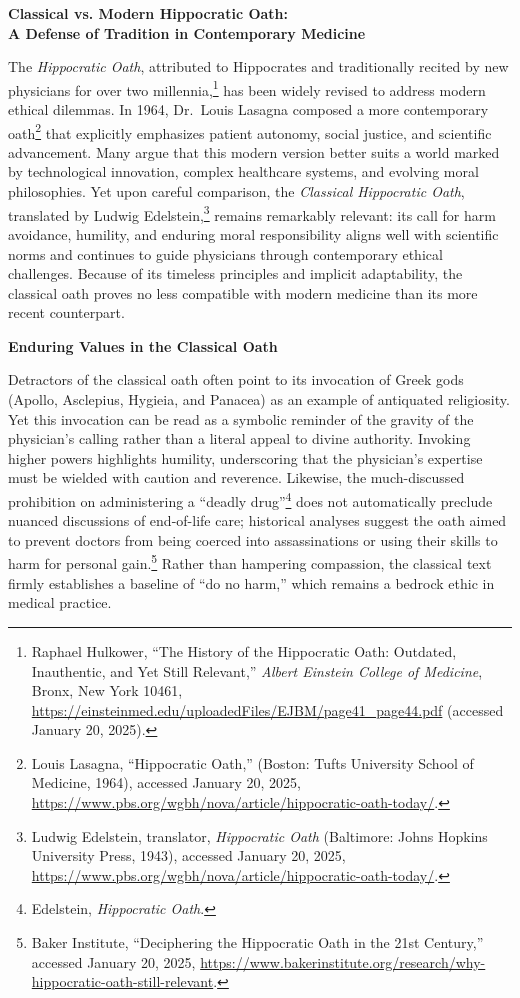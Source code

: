 \documentclass[12pt]{article}
\begin{document}
\begin{center}
\Large \textbf{Classical vs. Modern Hippocratic Oath: \\
A Defense of Tradition in Contemporary Medicine}
\end{center}

\bigskip

The \textit{Hippocratic Oath}, attributed to Hippocrates and traditionally recited by new physicians for over two millennia,\footnote{Raphael Hulkower, 
``The History of the Hippocratic Oath: Outdated, Inauthentic, and Yet Still Relevant,'' 
\textit{Albert Einstein College of Medicine}, Bronx, New York 10461, 
\url{https://einsteinmed.edu/uploadedFiles/EJBM/page41_page44.pdf} (accessed January 20, 2025).} 
has been widely revised to address modern ethical dilemmas. 
In 1964, Dr.\ Louis Lasagna composed a more contemporary oath\footnote{Louis Lasagna, 
``Hippocratic Oath,'' (Boston: Tufts University School of Medicine, 1964), 
accessed January 20, 2025, \url{https://www.pbs.org/wgbh/nova/article/hippocratic-oath-today/}.} 
that explicitly emphasizes patient autonomy, social justice, and scientific advancement. 
Many argue that this modern version better suits a world marked by technological innovation, complex healthcare systems, 
and evolving moral philosophies. 
Yet upon careful comparison, the \textit{Classical Hippocratic Oath}, 
translated by Ludwig Edelstein,\footnote{Ludwig Edelstein, translator, \textit{Hippocratic Oath} 
(Baltimore: Johns Hopkins University Press, 1943), accessed January 20, 2025, 
\url{https://www.pbs.org/wgbh/nova/article/hippocratic-oath-today/}.} 
remains remarkably relevant: its call for harm avoidance, humility, and enduring moral responsibility aligns well with scientific norms 
and continues to guide physicians through contemporary ethical challenges. 
Because of its timeless principles and implicit adaptability, 
the classical oath proves no less compatible with modern medicine than its more recent counterpart.

\bigskip
\textbf{Enduring Values in the Classical Oath}

Detractors of the classical oath often point to its invocation of Greek gods (Apollo, Asclepius, Hygieia, and Panacea) 
as an example of antiquated religiosity. 
Yet this invocation can be read as a symbolic reminder of the gravity of the physician’s calling rather than a literal appeal to divine authority. 
Invoking higher powers highlights humility, underscoring that the physician’s expertise must be wielded with caution and reverence. 
Likewise, the much-discussed prohibition on administering a ``deadly drug''\footnote{Edelstein, \textit{Hippocratic Oath}.} 
does not automatically preclude nuanced discussions of end-of-life care; 
historical analyses suggest the oath aimed to prevent doctors from being coerced into assassinations or using their skills to harm for personal gain.\footnote{Baker Institute, 
``Deciphering the Hippocratic Oath in the 21st Century,'' accessed January 20, 2025, 
\url{https://www.bakerinstitute.org/research/why-hippocratic-oath-still-relevant}.} 
Rather than hampering compassion, the classical text firmly establishes a baseline of ``do no harm,'' 
which remains a bedrock ethic in medical practice.
\end{document}
